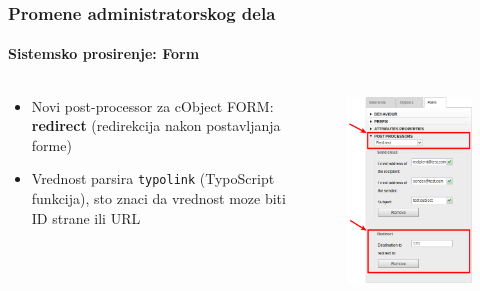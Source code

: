 \begin{frame}[fragile]
	\frametitle{Promene administratorskog dela}
	\framesubtitle{Sistemsko prosirenje: Form}

	\begin{columns}[T]

		\begin{column}{.5\textwidth}
			\begin{itemize}
				\item Novi post-processor za cObject FORM: \textbf{redirect}\newline
					(redirekcija nakon postavljanja forme)
				\item Vrednost parsira \texttt{typolink} (TypoScript funkcija),\newline
					sto znaci da vrednost moze biti ID strane ili URL
			\end{itemize}
		\end{column}

		\begin{column}{.5\textwidth}
			\begin{figure}\vspace*{-0.4cm}
				\includegraphics[width=0.65\linewidth]{Images/BackendChanges/FormRedirectPostProcessor.png}
			\end{figure}
		\end{column}

	\end{columns}

\end{frame}


